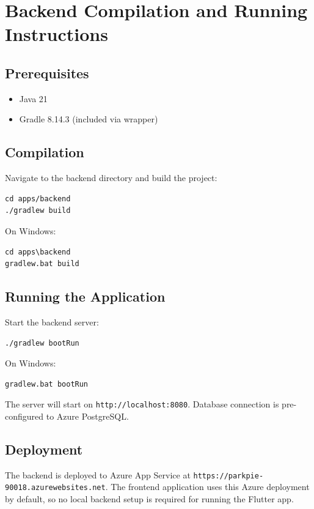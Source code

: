 \section{Backend Compilation and Running Instructions}

\subsection{Prerequisites}
\begin{itemize}
    \item Java 21
    \item Gradle 8.14.3 (included via wrapper)
\end{itemize}

\subsection{Compilation}
Navigate to the backend directory and build the project:
\begin{verbatim}
cd apps/backend
./gradlew build
\end{verbatim}

On Windows:
\begin{verbatim}
cd apps\backend
gradlew.bat build
\end{verbatim}

\subsection{Running the Application}
Start the backend server:
\begin{verbatim}
./gradlew bootRun
\end{verbatim}

On Windows:
\begin{verbatim}
gradlew.bat bootRun
\end{verbatim}

The server will start on \texttt{http://localhost:8080}. Database connection is pre-configured to Azure PostgreSQL.

\subsection{Deployment}
The backend is deployed to Azure App Service at \texttt{https://parkpie-90018.azurewebsites.net}. The frontend application uses this Azure deployment by default, so no local backend setup is required for running the Flutter app.
